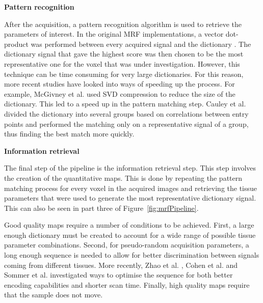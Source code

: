 \hfill

\large \textbf{Pattern recognition} \normalsize

After the acquisition, a pattern recognition algorithm is used to retrieve the parameters of interest.
In the original MRF implementations, a vector dot-product was performed between every acquired signal and the dictionary \cite{Ma2013} \cite{Jiang2015}. 
The dictionary signal that gave the highest score was then chosen to be the most representative one for the voxel that was under investigation.
However, this technique can be time consuming for very large dictionaries.
For this reason, more recent studies have looked into ways of speeding up the process.
For example, McGivney et al. \cite{McGivney2014} used SVD compression to reduce the size of the dictionary.
This led to a speed up in the pattern matching step.
Cauley et al. \cite{Cauley2015fgm} divided the dictionary into several groups based on correlations between entry points and performed the matching only on a representative signal of a group, thus finding the best match more quickly.


\hfill

\large \textbf{Information retrieval} \normalsize

The final step of the pipeline is the information retrieval step.
This step involves the creation of the quantitative maps.
This is done by repeating the pattern matching process for every voxel in the acquired images and retrieving the tissue parameters that were used to generate the most representative dictionary signal.
This can also be seen in part three of Figure~\ref{fig:mrfPipeline}.

\hfill

Good quality maps require a number of conditions to be achieved.
First, a large enough dictionary must be created to account for a wide range of possible tissue parameter combinations.
Second, for pseudo-random acquisition parameters, a long enough sequence is needed to allow for better discrimination between signals coming from different tissues. 
More recently, Zhao et al. \cite{Zhao2017}, Cohen et al. \cite{Cohen2016} and Sommer et al. \cite{Sommer2017} investigated ways to optimise the sequence for both better encoding capabilities and shorter scan time.
Finally, high quality maps require that the sample does not move.

\hfill


